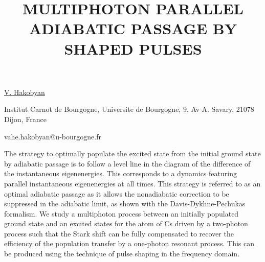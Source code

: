 \title{MULTIPHOTON PARALLEL ADIABATIC PASSAGE BY SHAPED PULSES}

\underline{V. Hakobyan} 

{\normalsize{\vspace{-4mm}
Institut Carnot de Bourgogne, Universite de Bourgogne, 9, Av A.
Savary, 21078 Dijon, France

\email vahe.hakobyan@u-bourgogne.fr}}

The strategy to optimally populate the excited state from the initial ground state by adiabatic
passage is to follow a level line in the diagram of the difference of the instantaneous eigenenergies.
This corresponds to a dynamics featuring parallel instantaneous eigenenergies at all times. This
strategy is referred to as an optimal adiabatic passage as it allows the nonadiabatic correction to be
suppressed in the adiabatic limit, as shown with the Davis-Dykhne-Pechukas formalism.
We study a multiphoton process between an initially populated ground state  and an excited states for
the atom of Cs  driven by a two-photon process such that the Stark shift can be fully compensated to
recover the efficiency of the population transfer by a one-photon resonant process. This can be
produced using the technique of pulse shaping in the frequency domain.

\vspace{\baselineskip} 
